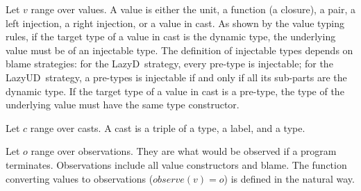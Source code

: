 \documentclass[acmsmall,review,anonymous]{acmart}\settopmatter{printfolios=true,printccs=false,printacmref=false}
\newcommand{\lazyUD}{Lazy\;UD}
\newcommand{\lazyD}{Lazy\;D}
\begin{document}
Let $v$ range over values. A value is either the unit, a function (a
closure), a pair, a left injection, a right injection, or a value in cast. As 
shown by the value typing rules, if the target type of a
value in cast is the dynamic type, the underlying value must be of an
injectable type. The definition of injectable types depends on blame
strategies: for the \lazyD\ strategy, every pre-type is injectable;
for the \lazyUD\ strategy, a pre-types is injectable if and only if
all its sub-parts are the dynamic type. If the target type of a value in cast 
is a pre-type, the type of the underlying value must have the
same type constructor.

Let $c$ range over casts. A cast is a triple of a type, a label, and a type.

Let $o$ range over observations. They are what would be observed if
a program terminates. Observations include all value constructors and
blame.  The function converting values to observations ($observe(v) =
o$) is defined in the natural way.
\end{document}
